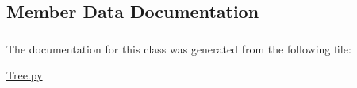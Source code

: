 \subsection{Member Data Documentation}
\hypertarget{classAlbero_1_1Tree_1_1SelectionList_a8bf32cbea89df3577a9ae859b7e4042a}{
\subsubsection[{selectionlist}]{}}
\label{classAlbero_1_1Tree_1_1SelectionList_a8bf32cbea89df3577a9ae859b7e4042a}


The documentation for this class was generated from the following file:\begin{DoxyCompactItemize}
\item 
\hyperlink{Tree_8py}{Tree.py}\end{DoxyCompactItemize}
